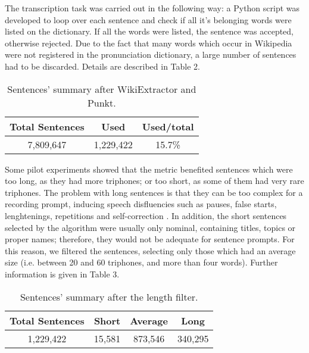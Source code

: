 The transcription task was carried out in the following way: a Python script was developed to loop over each sentence 
and check if all it's belonging words were listed on the dictionary. If all the words were listed, the sentence was 
accepted, otherwise rejected. Due to the fact that many words which occur in Wikipedia were not registered in the 
pronunciation dictionary, a large number of sentences had to be discarded. Details are described in Table 2.

\begin{table}[H]
\begin{center}
\begin{tabular}{|c|c|c|}
\hline \bf Total Sentences & \bf Used & \bf Used/total\\ \hline
7,809,647 & 1,229,422 & 15.7\% \\
\hline
\end{tabular}
\end{center}
\caption{\label{wikipedia-used-discarded} Sentences' summary after WikiExtractor and Punkt.}
\end{table}

Some pilot experiments showed that the metric benefited sentences which were too long, as they had more 
triphones; or too short, as some of them had very rare triphones. The problem with long sentences is that they
can be too complex for a recording prompt, inducing speech disfluencies such as pauses, false starts, 
lenghtenings, repetitions and self-correction \cite{Watanabe2012}. In addition, the short sentences selected by
the algorithm were usually only nominal, containing titles, topics or proper names; therefore, they would
not be adequate for sentence prompts. For this reason, we filtered the sentences, selecting only those which had
an average size (i.e. between 20 and 60 triphones, and more than four words). Further information is given in Table 3.

\begin{table}[H]
\begin{center}
\begin{tabular}{|c|c|c|c|}
\hline
\textbf{Total Sentences} & \textbf{Short} & \textbf{Average} & \textbf{Long} \\ \hline
1,229,422 & 15,581 & 873,546 & 340,295 \\ \hline
\end{tabular}
\end{center}
\caption{\label{filtered-sent} Sentences' summary after the length filter.}
\end{table}


